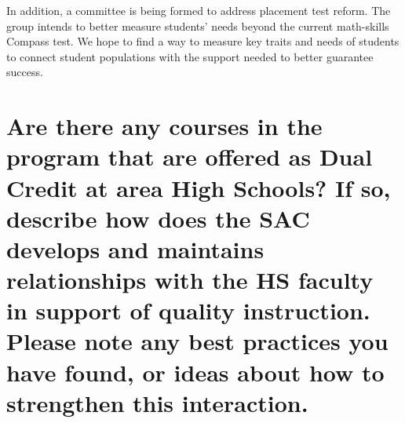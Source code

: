 In addition, a committee is being formed to address placement test reform. The group intends to better measure students' needs beyond the current math-skills Compass test. We hope to find a way to measure key traits and needs of students to connect student populations with the support needed to better guarantee success.

\section[Present dual credit relationships]{Are there any courses in the program that are offered as Dual Credit at area High Schools?  If so, describe how does the SAC develops and maintains relationships with the HS faculty in support of quality instruction. Please note any best practices you have found, or ideas about how to strengthen this interaction.  }

